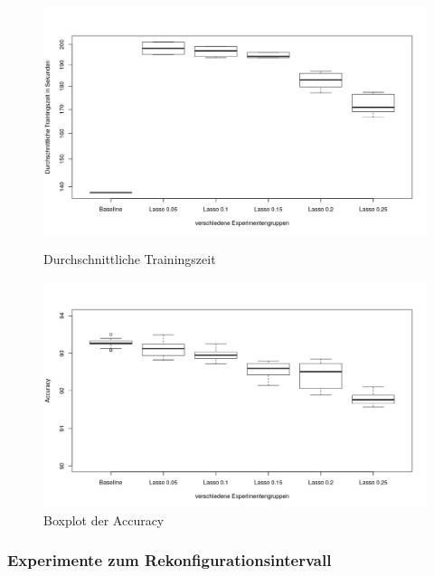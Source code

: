 \begin{figure}[h]
   \begin{minipage}[b]{.6\linewidth} %
      \includegraphics[width=0.95\linewidth]{KapitelPartB/Images/lasso1.png}
      \caption{Durchschnittliche Trainingszeit}
      \label{abb:lasso1}
   \end{minipage}
   \begin{minipage}[b]{.6\linewidth} %
      \includegraphics[width=0.95\linewidth]{KapitelPartB/Images/lasso2.png}
      \caption{Boxplot der Accuracy}
      \label{abb:lasso2}
   \end{minipage}
 \end{figure}

 
 


\subsubsection{Experimente zum Rekonfigurationsintervall}


